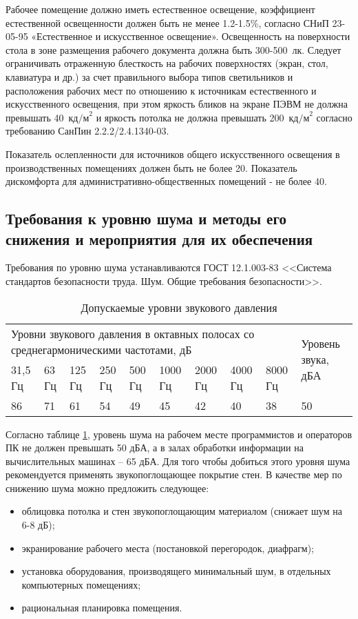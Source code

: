 Рабочее помещение должно иметь естественное освещение, коэффициент естественной освещенности должен быть не менее 1.2-1.5\%, согласно СНиП 23-05-95 «Естественное и искусственное освещение».
Освещенность на поверхности стола в зоне размещения рабочего документа должна быть 300-500~лк. Следует ограничивать отраженную блесткость на рабочих поверхностях (экран, стол, клавиатура и др.) за счет правильного выбора типов светильников и расположения рабочих мест по отношению к источникам естественного и искусственного освещения, при этом яркость бликов на экране ПЭВМ не должна превышать 40~$\mbox{кд/м}^2$ и яркость потолка не должна превышать 200~$\mbox{кд/м}^2$ согласно требованию СанПин 2.2.2/2.4.1340-03.

Показатель ослепленности для источников общего искусственного освещения в производственных помещениях должен быть не более 20. Показатель дискомфорта для административно-общественных помещений - не более 40. 

\subsection{Требования к уровню шума и методы его снижения и мероприятия для их обеспечения}
Требования по уровню шума устанавливаются ГОСТ 12.1.003-83 <<Система стандартов безопасности труда. Шум. Общие требования безопасности>>.
\begin{table}[h]
\caption{Допускаемые уровни звукового давления}
\label{noise_gost}
\begin{tabular}{|p{1.1cm}|p{1.1cm}|p{1.1cm}|p{1.1cm}|p{1.1cm}|p{1.1cm}|p{1.1cm}|p{1.1cm}|p{1.1cm}|m{2.8cm}|}
\hline
	\multicolumn{9}{|l|}{\parbox[c][3em]{12cm}{Уровни звукового давления в октавных полосах со среднегармоническими частотами, дБ}} & \multirow{2}{*}{\parbox{2.5cm}{Уровень звука, дБА}} \\
\cline{1-9}
	31,5 Гц & 63 Гц & 125 Гц & 250 Гц & 500 Гц & 1000 Гц & 2000 Гц & 4000 Гц & 8000 Гц & \\
\hline
	86 & 71 & 61 & 54 & 49 & 45 & 42 & 40 & 38 & 50 \\
\hline
\end{tabular}
\end{table}
Согласно таблице \ref{noise_gost}, уровень шума на рабочем месте программистов и операторов ПК не должен превышать 50 дБА, а в залах обработки информации на вычислительных машинах – 65 дБА. Для того чтобы добиться этого уровня  шума рекомендуется применять звукопоглощающее покрытие стен. 
В качестве мер по снижению шума можно предложить следующее:
\begin{itemize}
	\item облицовка потолка и стен звукопоглощающим материалом (снижает шум на 6-8 дБ);
	\item экранирование рабочего места (постановкой перегородок, диафрагм);
	\item установка оборудования, производящего минимальный шум, в отдельных компьютерных помещениях;
	\item рациональная планировка помещения.
\end{itemize}
 

